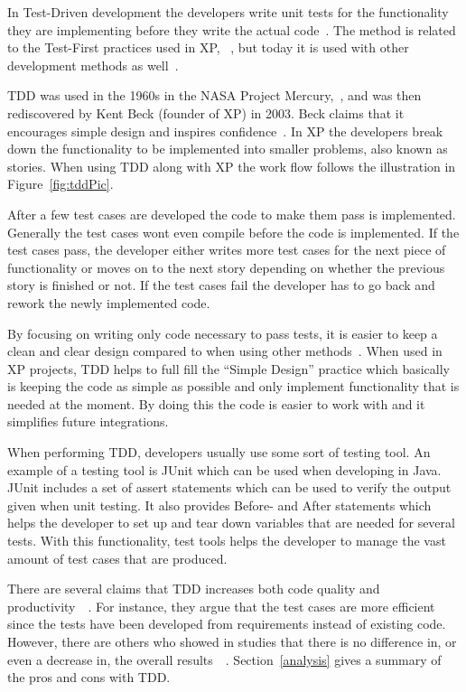 In Test-Driven development the developers write unit tests for the functionality they are implementing before they write the actual code~\cite{beckTestDriven}. The method is related to the Test-First practices used in XP, ~\cite{beckXP}, but today it is used with other development methods as well~\cite{MSNET}. 

TDD was used in the 1960s in the NASA Project Mercury,~\cite{NASA}, and was then rediscovered by Kent Beck (founder of XP) in 2003. Beck claims that it encourages simple design and inspires confidence~\cite{beckXP}. In XP the developers break down the functionality to be implemented into smaller problems, also known as stories. When using TDD along with XP the work flow follows the illustration in Figure~\ref{fig:tddPic}.

After a few test cases are developed the code to make them pass is implemented. Generally the test cases wont even compile before the code is implemented. If the test cases pass, the developer either writes more test cases for the next piece of functionality or moves on to the next story depending on whether the previous story is finished or not. If the test cases fail the developer has to go back and rework the newly implemented code.


By focusing on writing only code necessary to pass tests, it is easier to keep a clean and clear design compared to when using other methods~\cite{beckXP}. When used in XP projects, TDD helps to full fill the ``Simple Design'' practice which basically is keeping the code as simple as possible and only implement functionality that is needed at the moment. By doing this the code is easier to work with and it simplifies future integrations. 

When performing TDD, developers usually use some sort of testing tool. An example of a testing tool is JUnit which can be used when developing in Java. JUnit includes a set of assert statements which can be used to verify the output given when unit testing. It also provides Before- and After statements which helps the developer to set up and tear down variables that are needed for several tests. With this functionality, test tools helps the developer to manage the vast amount of test cases that are produced.

There are several claims that TDD increases both code quality and productivity~\cite{beckXP}~\cite{erdogmus}. For instance, they argue that the test cases are more efficient since the tests have been developed from requirements instead of existing code. However, there are others who showed in studies that there is no difference in, or even a decrease in, the overall results~\cite{tddInvest}~\cite{mullerandhagner}. Section~\ref{analysis} gives a summary of the pros and cons with TDD.
